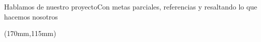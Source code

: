 \begin{frame}{Hablamos de nuestro proyecto}{Con metas parciales, referencias y  resaltando  lo que hacemos nosotros}
    \begin{textblock*}{85mm}(170mm,115mm)
        \begin{flushleft}
        \begin{spacing}{0}\scriptsize%
            \footnotemark[1]\\
            \footnotemark[2]\\
            \footnotemark[3]
        \end{spacing}
        \end{flushleft}
    \end{textblock*}
\end{frame}



